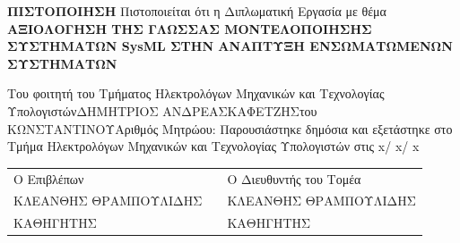 \documentclass[a4paper,12pt,twoside]{report}
\newcommand{ \FirstName}{ΔΗΜΗΤΡΙΟΣ ΑΝΔΡΕΑΣ}
\newcommand{ \LastName}{ΚΑΦΕΤΖΗΣ}
\newcommand{ \FathersName}{ΚΩΝΣΤΑΝΤΙΝΟΥ}
\newcommand{ \AM}{5657}
\newcommand{ \ThesisTitle}{ΑΞΙΟΛΟΓΗΣΗ ΤΗΣ ΓΛΩΣΣΑΣ ΜΟΝΤΕΛΟΠΟΙΗΣΗΣ ΣΥΣΤΗΜΑΤΩΝ SysML ΣΤΗΝ ΑΝΑΠΤΥΞΗ ΕΝΣΩΜΑΤΩΜΕΝΩΝ ΣΥΣΤΗΜΑΤΩΝ}
\newcommand{ \FirstProfessor}{ΚΛΕΑΝΘΗΣ ΘΡΑΜΠΟΥΛΙΔΗΣ}
\newcommand{ \FirstProfessorsRank}{ΚΑΘΗΓΗΤΗΣ}
\newcommand{ \SecondProfessor}{ΚΛΕΑΝΘΗΣ ΘΡΑΜΠΟΥΛΙΔΗΣ}
\newcommand{ \SecondProfessorsRank}{ΚΑΘΗΓΗΤΗΣ}
\newcommand{ \ExaminationDay}{x}
\newcommand{ \ExaminationMonth}{x}
\newcommand{ \ExaminationYear}{x}
\begin{document}
	\cleardoublepage
	\label{Δεύτερη σελίδα} 
		\begin{center}
			\textbf{{\LARGE ΠΙΣΤΟΠΟΙΗΣΗ}}\linebreak \linebreak
			{\large Πιστοποιείται ότι η Διπλωματική Εργασία με θέμα}\linebreak \linebreak
			{\Large \textbf{ \ThesisTitle}}\linebreak\linebreak\linebreak
			\begin{large}
				Του φοιτητή του Τμήματος Ηλεκτρολόγων Μηχανικών και Τεχνολογίας Υπολογιστών\linebreak \linebreak \linebreak \FirstName\space\LastName  του \FathersName\linebreak \linebreak Αριθμός Μητρώου:  \linebreak \AM \linebreak \linebreak \linebreak Παρουσιάστηκε δημόσια και εξετάστηκε στο Τμήμα Ηλεκτρολόγων Μηχανικών και Τεχνολογίας Υπολογιστών στις \linebreak \ExaminationDay / \ExaminationMonth / \ExaminationYear \linebreak
			\end{large}
		\end{center}
		\vspace{3cm}
		\begin{large}
			\begin{tabular}{m{5cm} m{1cm} m{6cm}}
			Ο Επιβλέπων & & Ο Διευθυντής του Τομέα\\
			\FirstProfessor & & \SecondProfessor \\
			\FirstProfessorsRank & & \SecondProfessorsRank
			\end{tabular}
		\end{large}
		
\end{document}
